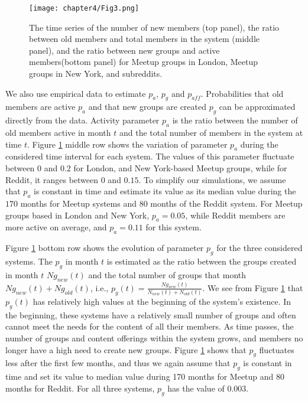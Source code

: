 \begin{figure}[h]
	\centering
	\texttt{[image: chapter4/Fig3.png]}
	\caption[The estimation of the model parameters for a groups growth model.]{The time series of the number of new members (top panel), the ratio between old members and total members in the system (middle panel), and the ratio between new groups and active members(bottom panel) for Meetup groups in London,  Meetup groups in New York, and subreddits. }
	\label{fig:fig5}
\end{figure}

We also use empirical data to estimate $p_{a}$, $p_{g}$ and $p_{aff}$. Probabilities that old members are active $p_a$ and that new groups are created $p_g$ can be approximated directly from the data. Activity parameter $p_{a}$ is the ratio between the number of old members active in month $t$ and the total number of members in the system at time $t$. Figure \ref{fig:fig5} middle row shows the variation of parameter $p_{a}$ during the considered time interval for each system. The values of this parameter fluctuate between $0$ and $0.2$ for London, and New York-based Meetup groups, while for Reddit, it ranges between $0$ and $0.15$.
To simplify our simulations, we assume that $p_{a}$ is constant in time and estimate its value as its median value during the $170$ months for Meetup systems and $80$ months of the Reddit system. For Meetup groups based in London and New York, $p_{a}=0.05$, while Reddit members are more active on average, and $p_{a}=0.11$ for this system.

Figure \ref{fig:fig5} bottom row shows the evolution of parameter $p_{g}$ for the three considered systems. The $p_{g}$ in month $t$ is estimated as the ratio between the groups created in month $t$ $Ng_{new}(t)$ and the total number of groups that month $Ng_{new}(t)+Ng_{old}(t)$, i.e., $p_{g}(t)=\frac{Ng_{new}(t)}{N_{new}(t)+N_{old}(t)}$. We see from Figure \ref{fig:fig5} that $p_{g}(t)$ has relatively high values at the beginning of the system's existence. In the beginning, these systems have a relatively small number of groups and often cannot meet the needs for the content of all their members. As time passes, the number of groups and content offerings within the system grows, and members no longer have a high need to create new groups. Figure \ref{fig:fig5} shows that $p_{g}$ fluctuates less after the first few months, and thus we again assume that $p_{g}$ is constant in time and set its value to median value during 170 months for Meetup and 80 months for Reddit. For all three systems, $p_{g}$ has the value of $0.003$.



